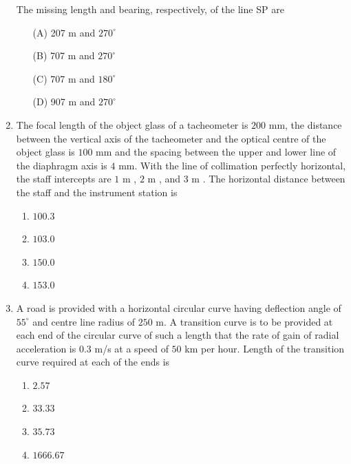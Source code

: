 \documentclass[journal]{IEEEtran}
\begin{document}
\begin{enumerate}
\vspace{0.5cm}

The missing length and bearing, respectively, of the line SP are \textbf{}

\begin{itemize}
\item[(A)] 207 m and $270^\circ$
\item[(B)] 707 m and $270^\circ$
\item[(C)] 707 m and $180^\circ$
\item[(D)] 907 m and $270^\circ$
\end{itemize}

\item The focal length of the object glass of a tacheometer is $200$ mm, the distance between the vertical axis of the tacheometer and the optical centre of the object glass is $100$ mm and the spacing between the upper and lower line of the diaphragm axis is $4$ mm. With the line of collimation perfectly horizontal, the staff intercepts are $1$ m , $2$ m , and $3$ m . The horizontal distance  between the staff and the instrument station is \textbf{}
\begin{multicols}{2}
\begin{enumerate}
\item $100.3$ 
\item $103.0$ 
\item $150.0$ 
\item $153.0$ 
\end{enumerate}  
\end{multicols}

\item A road is provided with a horizontal circular curve having deflection angle of $55^\circ$ and centre line radius of $250$ m. A transition curve is to be provided at each end of the circular curve of such a length that the rate of gain of radial acceleration is $0.3$ m/s at a speed of $50$ km per hour. Length of the transition curve required at each of the ends is \textbf{}
\begin{multicols}{2}
\begin{enumerate}
\item $2.57$ 
\item $33.33$ 
\item $35.73$ 
\item $1666.67$ 
\end{enumerate}  
\end{multicols}


\end{enumerate}
\end{document}
